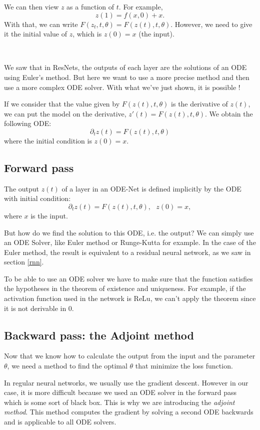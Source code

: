 \documentclass[10pt,a4paper]{article}
\theoremstyle{definition}
\theoremstyle{definition}
\theoremstyle{definition}
\begin{document}
We can then view $z$ as a function of $t$. For example,
$$z(1) = f(x, 0) + x.$$
With that, we can write $F(z_t, t, \theta) = F(z(t), t, \theta)$. However, we need to give it the initial value of $z$, which is $z(0) = x$ (the input).

~

We saw that in ResNets, the outputs of each layer are the solutions of an ODE using Euler's method. But here we want to use a more precise method and then use a more complex ODE solver. With what we've just shown, it is possible !

If we consider that the value given by $F(z(t), t, \theta)$ is the derivative of $z(t)$, we can put the model on the derivative, $z'(t) = F(z(t), t, \theta)$.  We obtain the following ODE:
$$ \partial_t z(t) = F(z(t), t, \theta) $$
where the initial condition is $z(0) = x$. 

\subsection{Forward pass}

The output $z(t)$ of a layer in an ODE-Net is defined implicitly by the ODE with initial condition:
$$ \partial_t z(t) = F(z(t), t, \theta), \ \ \ z(0) = x, $$
where $x$ is the input.

But how do we find the solution to this ODE, i.e. the output? We can simply use an ODE Solver, like Euler method or Runge-Kutta for example. In the case of the Euler method, the result is equivalent to a residual neural network, as we saw in section \ref{rnn}.

To be able to use an ODE solver we have to make sure that the function satisfies the hypotheses in the theorem of existence and uniqueness. For example, if the activation function used in the network is ReLu, we can't apply the theorem since it is not derivable in $0$.

\subsection{Backward pass: the Adjoint method}
Now that we know how to calculate the output from the input and the parameter $\theta$, we need a method to find the optimal $\theta$ that minimize the loss function.

In regular neural networks, we usually use the gradient descent. However in our case, it is more difficult because we used an ODE solver in the forward pass which is some sort of black box. This is why we are introducing the \textit{adjoint method}. This method computes the gradient by solving a second ODE backwards and is applicable to all ODE solvers.
\end{document}
